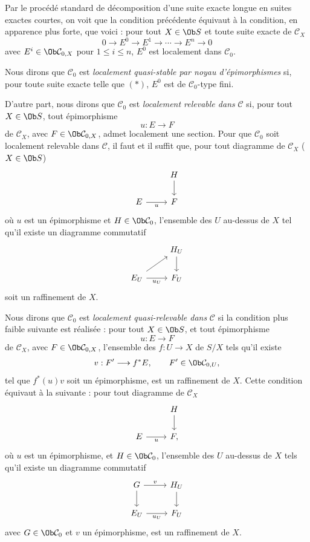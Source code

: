 \documentclass[11pt]{article}
\begin{document}
Par le procédé standard de décomposition d'une suite exacte longue en suites exactes courtes, on voit que la condition précédente équivaut à la condition, en apparence plus forte, que voici : pour tout \(X\in\Ob S\) et toute suite exacte de \(\mathcal C_X\)
\begin{equation}\tag{*}
  0\longrightarrow E^0\longrightarrow E^1\longrightarrow\cdots\longrightarrow E^n\longrightarrow 0
\end{equation}
avec \(E^i\in\Ob\mathcal C_{0,X}\) pour \(1\leq i\leq n\), \(E^0\) est localement dans \(\mathcal C_0\).

Nous dirons que \(\mathcal C_0\) est \emph{localement quasi-stable par noyau d'épimorphismes} si, pour toute suite exacte telle que \((*)\), \(E^0\) est de \(\mathcal C_0\)-type fini.

D'autre part, nous dirons que \(\mathcal C_0\) est \emph{localement relevable dans} \(\mathcal C\) si, pour tout \(X\in\Ob S\), tout épimorphisme
\[
  u:E\longrightarrow F
\]
de \(\mathcal C_X\), avec \(F\in\Ob\mathcal C_{0,X}\), admet localement une section. Pour que \(\mathcal C_0\) soit localement relevable dans \(\mathcal C\), il faut et il suffit que, pour tout diagramme de \(\mathcal C_X\) (\(X\in\Ob S\))
\[
\begin{tikzcd}
& H \arrow[d]\\
E \arrow[r,"u"'] & F
\end{tikzcd}
\]
où \(u\) est un épimorphisme et \(H\in\Ob\mathcal C_0\), l'ensemble des \(U\) au-dessus de \(X\) tel qu'il existe un diagramme commutatif
\[
\begin{tikzcd}
& H_U \arrow[d]\\
E_U \arrow[r,"u_U"'] \arrow[ur] & F_U
\end{tikzcd}
\]
soit un raffinement de \(X\).

Nous dirons que \(\mathcal C_0\) est \emph{localement quasi-relevable dans} \(\mathcal C\) si la condition plus faible suivante est réalisée : pour tout \(X\in\Ob S\), et tout épimorphisme
\[
  u:E\longrightarrow F
\]
de \(\mathcal C_X\), avec \(F\in\Ob\mathcal C_{0,X}\), l'ensemble des \(f:U\to X\) de \(S/X\) tels qu'il existe
\[
  v:F'\longrightarrow f^*E,\qquad F'\in\Ob\mathcal C_{0,U},
\]
tel que \(f^*(u)v\) soit un épimorphisme, est un raffinement de \(X\). Cette condition équivaut à la suivante : pour tout diagramme de \(\mathcal C_X\)
\[
\begin{tikzcd}
& H \arrow[d]\\
E \arrow[r,"u"'] & F ,
\end{tikzcd}
\]
où \(u\) est un épimorphisme, et \(H\in\Ob\mathcal C_0\), l'ensemble des \(U\) au-dessus de \(X\) tels qu'il existe un diagramme commutatif
\[
\begin{tikzcd}
G \arrow[r,"v"] \arrow[d] & H_U \arrow[d]\\
E_U \arrow[r,"u_U"'] & F_U
\end{tikzcd}
\]
avec \(G\in\Ob\mathcal C_0\) et \(v\) un épimorphisme, est un raffinement de \(X\).
\end{document}
